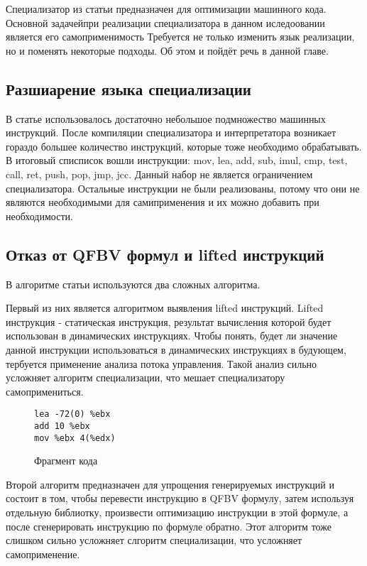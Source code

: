 \documentclass{spbau-diploma}
\begin{document}
Специализатор из статьи \cite{PEMC} предназначен для оптимизации машинного кода. Основной задачейпри реализации специализатора в данном иследоовании является его самоприменимость Требуется не только изменить язык реализации, но и поменять некоторые подходы. Об этом и пойдёт речь в данной главе.
\subsection{ Разшиарение языка специализации}
В статье \cite{PEMC} использовалось достаточно небольшое подмножество машинных инструкций. После компиляции специализатора и интерпретатора возникает гораздо большее количество инструкций, которые тоже необходимо обрабатывать. В итоговый списписок вошли инструкции: mov, lea, add, sub, imul, cmp, test, call, ret, push, pop, jmp, jcc. Данный набор не является ограничением специализатора. Остальные инструкции не были реализованы, потому что они не являются необходимыми для самиприменения и их можно добавить при необходимости.
\subsection{ Отказ от QFBV формул и lifted инструкций}


В алгоритме статьи \cite{PEMC} используются два сложных алгоритма. 

Первый из них является алгоритмом выявления lifted инструкций. Lifted инструкция - статическая инструкция, результат вычисления которой будет использован в динамических инструкциях. Чтобы понять, будет ли значение данной инструкции использоваться в динамических инструкциях в будующем, тербуется применение анализа потока управления. Такой анализ сильно усложняет алгоритм специализации, что мешает специализатору самопримениться. 
\begin{wrapfigure}{r}{0.4\textwidth}
\begin{lstlisting}[xleftmargin = 20pt]
lea -72(0) %ebx
add 10 %ebx
mov %ebx 4(%edx)
\end{lstlisting}
\caption{Фрагмент кода}
\label{fig:qfbv1}
\end{wrapfigure}

Второй алгоритм предназначен для упрощения генерируемых инструкций и состоит в том, чтобы перевести инструкцию в QFBV формулу, затем используя отдельную библиотку, произвести оптимизацию инструкции в этой формуле, а после сгенерировать инструкцию по формуле обратно. Этот алгоритм тоже слишком сильно усложняет слгоритм специализации, что усложняет самоприменение.
\end{document}
